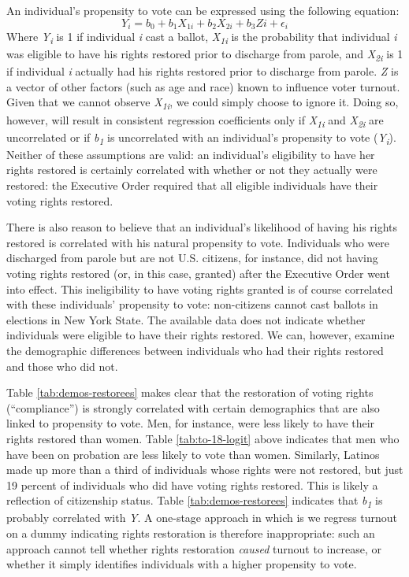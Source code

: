 \documentclass[]{article}
\begin{document}
An individual's propensity to vote can be expressed using the following equation:
\[ Y_i =  b_0 + b_{1}X_{1i} + b_{2}X_{2i} + b_{3}Z{i}+ \epsilon_{i} \]
Where \emph{Y\textsubscript{i}} is 1 if individual \emph{i} cast a ballot, \emph{X\textsubscript{1i}} is the probability that individual \emph{i} was eligible to have his rights restored prior to discharge from parole, and \emph{X\textsubscript{2i}} is 1 if individual \emph{i} actually had his rights restored prior to discharge from parole. \emph{Z} is a vector of other factors (such as age and race) known to influence voter turnout. Given that we cannot observe \emph{X\textsubscript{1i}}, we could simply choose to ignore it. Doing so, however, will result in consistent regression coefficients only if \emph{X\textsubscript{1i}} and \emph{X\textsubscript{2i}} are uncorrelated or if \emph{b\textsubscript{1}} is uncorrelated with an individual's propensity to vote (\emph{Y\textsubscript{i}}). Neither of these assumptions are valid: an individual's eligibility to have her rights restored is certainly correlated with whether or not they actually were restored: the Executive Order required that all eligible individuals have their voting rights restored.

There is also reason to believe that an individual's likelihood of having his rights restored is correlated with his natural propensity to vote. Individuals who were discharged from parole but are not U.S. citizens, for instance, did not having voting rights restored (or, in this case, granted) after the Executive Order went into effect. This ineligibility to have voting rights granted is of course correlated with these individuals' propensity to vote: non-citizens cannot cast ballots in elections in New York State. The available data does not indicate whether individuals were eligible to have their rights restored. We can, however, examine the demographic differences between individuals who had their rights restored and those who did not.



Table \ref{tab:demos-restorees} makes clear that the restoration of voting rights (``compliance'') is strongly correlated with certain demographics that are also linked to propensity to vote. Men, for instance, were less likely to have their rights restored than women. Table \ref{tab:to-18-logit} above indicates that men who have been on probation are less likely to vote than women. Similarly, Latinos made up more than a third of individuals whose rights were not restored, but just 19 percent of individuals who did have voting rights restored. This is likely a reflection of citizenship status. Table \ref{tab:demos-restorees} indicates that \emph{b\textsubscript{1}} is probably correlated with \emph{Y}. A one-stage approach in which is we regress turnout on a dummy indicating rights restoration is therefore inappropriate: such an approach cannot tell whether rights restoration \emph{caused} turnout to increase, or whether it simply identifies individuals with a higher propensity to vote.
\end{document}
